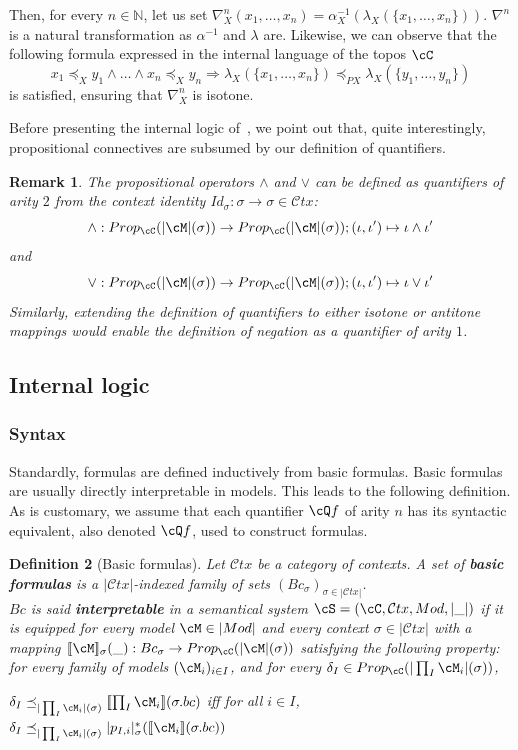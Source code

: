 \documentclass[preprint,3p,times]{elsarticle}
\newtheorem{definition}{Definition}[section]
\newtheorem{remark}[definition]{Remark}
\def\sem#1{[\![ #1 ] \!]}
\newcommand{\Ctx}{\mathcal{C}tx}
\begin{document}
Then, for every $n \in \mathbb{N}$, let us set $\nabla^n_X(x_1,\ldots,x_n) = \alpha^{-1}_X(\lambda_X(\{x_1,\ldots,x_n\}))$. $\nabla^n$ is a natural transformation as $\alpha^{-1}$ and $\lambda$ are. Likewise, we can observe that the following formula expressed in the internal language of the topos $\cC$
$$x_1 \preceq_X y_1 \wedge \ldots \wedge x_n \preceq_X y_n \Rightarrow \lambda_X(\{x_1,\ldots,x_n\}) \preceq_{PX} \lambda_X(\{y_1,\ldots,y_n\})$$
is satisfied, ensuring that $\nabla^n_X$ is isotone. 

Before presenting the internal logic of~\cite{AB23}, we point out that, quite interestingly, propositional connectives are subsumed by our definition of quantifiers.

\begin{remark}
The propositional operators $\wedge$ and $\vee$ can be defined as quantifiers of arity $2$ from the context identity $Id_\sigma : \sigma \to \sigma \in \Ctx$:
\[
    \wedge : Prop_{\cC}(|\cM|(\sigma)) \to Prop_{\cC}(|\cM|(\sigma));(\iota,\iota') \mapsto \iota \wedge \iota'
\]
and 
\[
    \vee : Prop_{\cC}(|\cM|(\sigma)) \to Prop_{\cC}(|\cM|(\sigma));(\iota,\iota') \mapsto \iota \vee \iota'
\]
Similarly, extending the definition of quantifiers to either isotone or antitone mappings would enable the definition of negation as a quantifier of arity \(1\). 
\end{remark}

\subsection{Internal logic}
\label{subsec:internallogic}

\subsubsection{Syntax}

Standardly, formulas are defined inductively from basic formulas. Basic formulas are usually directly interpretable in models. This leads to the following definition. As is customary, we assume that each quantifier $\cQ f$ of arity $n$ has its syntactic equivalent, also denoted $\cQ f$, used to construct formulas.

\begin{definition}[Basic formulas]
\label{def:basic formulas}
Let $\Ctx$ be a category of contexts. A set of {\bf basic formulas} is a $|\Ctx|$-indexed family of sets $(Bc_\sigma)_{\sigma \in |\Ctx|}$. \\
$Bc$ is said {\bf interpretable} in a semantical system $\cS = (\cC,\Ctx,Mod,|\_|)$ if it is equipped for every model $\cM \in |Mod|$ and every context $\sigma \in |\Ctx|$ with a mapping $\sem{\cM}_\sigma(\_) : Bc_\sigma \to Prop_\cC(|\cM|(\sigma))$ satisfying the following property: for every family of models $(\cM_i)_{i \in I}$, %
and for every $\delta_I \in Prop_\cC(|\prod_I \cM_i|(\sigma))$, 
\begin{center}
\(\delta_I \preceq_{|\prod_I \cM_i|(\sigma)} \sem{\prod_I \cM_i}(\sigma.bc)\) iff for all $i \in I$, $\delta_I \preceq_{|\prod_I \cM_i|(\sigma)} |p_{I,i}|^*_\sigma(\sem{\cM_i}(\sigma.bc))$
\end{center}
\end{definition}
\end{document}

